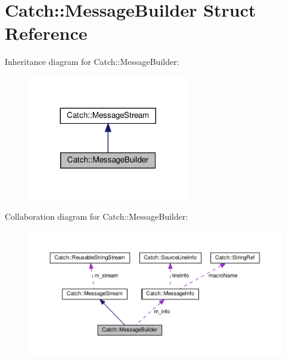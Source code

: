 \hypertarget{structCatch_1_1MessageBuilder}{}\section{Catch\+::Message\+Builder Struct Reference}
\label{structCatch_1_1MessageBuilder}


Inheritance diagram for Catch\+::Message\+Builder\+:
\nopagebreak
\begin{figure}[H]
\begin{center}
\leavevmode
\includegraphics[width=200pt]{structCatch_1_1MessageBuilder__inherit__graph}
\end{center}
\end{figure}


Collaboration diagram for Catch\+::Message\+Builder\+:
\nopagebreak
\begin{figure}[H]
\begin{center}
\leavevmode
\includegraphics[width=350pt]{structCatch_1_1MessageBuilder__coll__graph}
\end{center}
\end{figure}
